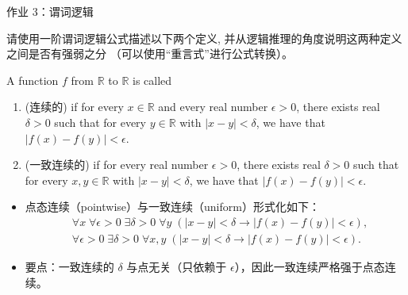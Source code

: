 
\begin{frame}[allowframebreaks]{作业 3：谓词逻辑}

\begin{problem}
  请使用一阶谓词逻辑公式描述以下两个定义,
  并从逻辑推理的角度说明这两种定义之间是否有强弱之分
  （可以使用``重言式''进行公式转换）。

  A function $f$ from $\mathbb{R}$ to $\mathbb{R}$ is called
  \begin{enumerate}[(1)]
    \setlength{\itemsep}{10pt}
    \item {} (连续的) if
      for every $x \in \mathbb{R}$
      and every real number $\epsilon > 0$,
      there exists real $\delta > 0$ such that
      for every $y \in \mathbb{R}$ with $|x - y| < \delta$,
      we have that $|f(x) -  f(y)|< \epsilon$.
    \item {} (一致连续的) if
      for every real number $\epsilon > 0$,
      there exists real $\delta > 0$ such that
      for every $x, y \in \mathbb{R}$ with $|x - y| < \delta$,
      we have that $|f(x) -  f(y)|< \epsilon$.
  \end{enumerate}
\end{problem}

\pause
\begin{slidesolution}
  \begin{itemize}
    \item 点态连续（pointwise）与一致连续（uniform）形式化如下：
      \begin{align*}
        &\forall x\; \forall \epsilon>0\; \exists \delta>0\; \forall y\; (|x-y|<\delta \to |f(x)-f(y)|<\epsilon), \\
        &\forall \epsilon>0\; \exists \delta>0\; \forall x,y\; (|x-y|<\delta \to |f(x)-f(y)|<\epsilon).
      \end{align*}
    \pause
    \item 要点：一致连续的 $\delta$ 与点无关（只依赖于 $\epsilon$），因此一致连续严格强于点态连续。
  \end{itemize}
\end{slidesolution}

\end{frame}
